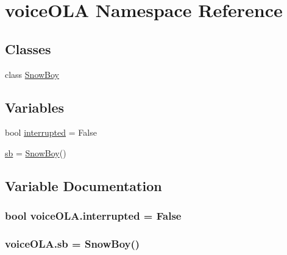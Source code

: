 \hypertarget{namespacevoiceOLA}{}\section{voice\+O\+LA Namespace Reference}
\label{namespacevoiceOLA}
\subsection*{Classes}
\begin{DoxyCompactItemize}
\item 
class \hyperlink{classvoiceOLA_1_1SnowBoy}{Snow\+Boy}
\end{DoxyCompactItemize}
\subsection*{Variables}
\begin{DoxyCompactItemize}
\item 
bool \hyperlink{namespacevoiceOLA_ae540347cd2179f646e3cfb67daa88653}{interrupted} = False
\item 
\hyperlink{namespacevoiceOLA_a98b541c0e2a8ffdbeff5bdd9829baf3a}{sb} = \hyperlink{classvoiceOLA_1_1SnowBoy}{Snow\+Boy}()
\end{DoxyCompactItemize}


\subsection{Variable Documentation}
\subsubsection[{\texorpdfstring{interrupted}{interrupted}}]{\setlength{\rightskip}{0pt plus 5cm}bool voice\+O\+L\+A.\+interrupted = False}\hypertarget{namespacevoiceOLA_ae540347cd2179f646e3cfb67daa88653}{}\label{namespacevoiceOLA_ae540347cd2179f646e3cfb67daa88653}
\subsubsection[{\texorpdfstring{sb}{sb}}]{\setlength{\rightskip}{0pt plus 5cm}voice\+O\+L\+A.\+sb = {\bf Snow\+Boy}()}\hypertarget{namespacevoiceOLA_a98b541c0e2a8ffdbeff5bdd9829baf3a}{}\label{namespacevoiceOLA_a98b541c0e2a8ffdbeff5bdd9829baf3a}
